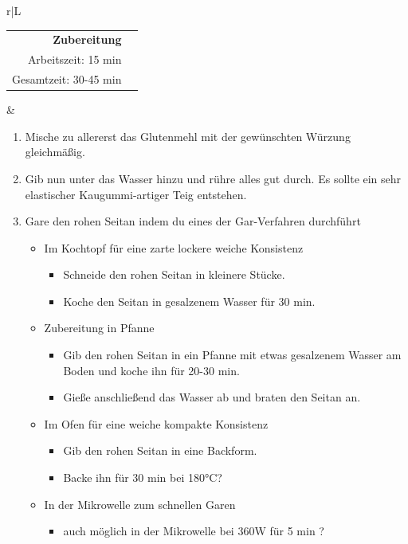 \documentclass[a4paper, 12pt]{scrbook} 								%
\numberwithin{equation}{section} 									%
\begin{document}
	\newpage
	\begin{tabularx}{\textwidth}{r|L}
		\begin{tabular}[t]{rr}
			\textbf{Zubereitung}	\\
			Arbeitszeit: 15 min	\\
			Gesamtzeit:	30-45 min \\
		\end{tabular}			&	\begin{enumerate}[nosep]
											\item Mische zu allererst das Glutenmehl mit der gewünschten Würzung gleichmäßig.
											\item Gib nun unter das Wasser hinzu und rühre alles gut durch. Es sollte ein sehr elastischer Kaugummi-artiger Teig entstehen.
											\item Gare den rohen Seitan indem du eines der Gar-Verfahren durchführt
											\begin{itemize}
												\item Im Kochtopf für eine zarte lockere weiche Konsistenz
												\begin{itemize}
													\item Schneide den rohen Seitan in kleinere Stücke.
													\item Koche den Seitan in gesalzenem Wasser für 30 min.
												\end{itemize}
												\item Zubereitung in Pfanne
												\begin{itemize}
													\item Gib den rohen Seitan in ein Pfanne mit etwas gesalzenem Wasser am Boden und koche ihn für 20-30 min.
													\item Gieße anschließend das Wasser ab und braten den Seitan an.
												\end{itemize}
												\item Im Ofen für eine weiche kompakte Konsistenz
												\begin{itemize}
													\item Gib den rohen Seitan in eine Backform.
													\item Backe ihn für 30 min bei 180°C?
												\end{itemize}
												\item In der Mikrowelle zum schnellen Garen
												\begin{itemize}
													\item auch möglich in der Mikrowelle bei 360W für 5 min ?
												\end{itemize}
											\end{itemize}
													
									\end{enumerate}	\\
	\end{tabularx}
	\newpage
\end{document}
